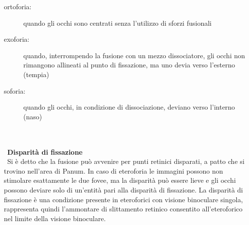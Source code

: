  \begin{description}
 \item[ortoforia:]quando gli occhi sono centrati senza l’utilizzo di sforzi fusionali
 \item[exoforia:]quando, interrompendo la fusione con un mezzo dissociatore, gli occhi non rimangono allineati al punto di fissazione, ma uno devia verso l’esterno (tempia)
 \item[soforia:]quando gli occhi, in condizione di dissociazione, deviano verso l’interno (naso)
\end{description}
\\\ \\\
\textbf{Disparità di fissazione}
\\\
Si è detto che la fusione può avvenire per punti retinici disparati, a patto che si trovino nell’area di Panum. In caso di eteroforia le immagini possono non stimolare esattamente le due fovee, ma la disparità può essere lieve e gli occhi possono deviare solo di un’entità pari alla disparità di fissazione. La disparità di fissazione è una condizione presente in eteroforici con visione binoculare singola, rappresenta quindi l’ammontare di slittamento retinico consentito all’eteroforico nel limite della visione binoculare.